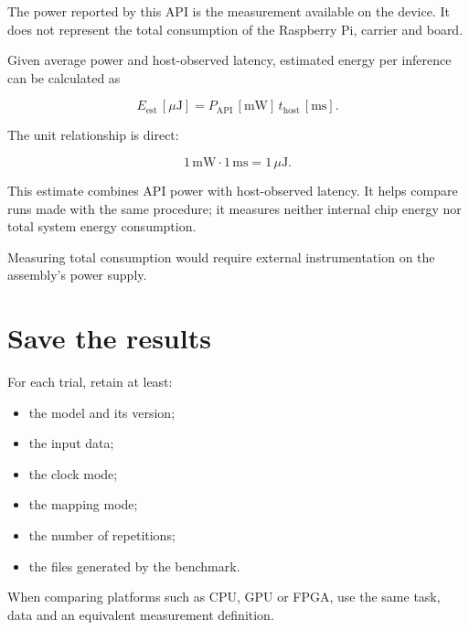 The power reported by this API is the measurement available on the device. It does
not represent the total consumption of the Raspberry Pi, carrier and board.

Given average power and host-observed latency, estimated energy per inference can be
calculated as

\begin{equation}
  E_{\mathrm{est}} \,[\mu\mathrm{J}]
  =
  P_{\mathrm{API}} \,[\mathrm{mW}]
  \,
  t_{\mathrm{host}} \,[\mathrm{ms}].
\end{equation}

The unit relationship is direct:

\[
1\,\mathrm{mW}\cdot 1\,\mathrm{ms}
=
1\,\mu\mathrm{J}.
\]

This estimate combines API power with host-observed latency. It helps compare runs
made with the same procedure; it measures neither internal chip energy nor total
system energy consumption.

Measuring total consumption would require external instrumentation on the assembly's
power supply.

\section{Save the results}

For each trial, retain at least:

\begin{itemize}
  \item the model and its version;
  \item the input data;
  \item the clock mode;
  \item the mapping mode;
  \item the number of repetitions;
  \item the files generated by the benchmark.
\end{itemize}

When comparing platforms such as CPU, GPU or FPGA, use the same task, data and an
equivalent measurement definition.
